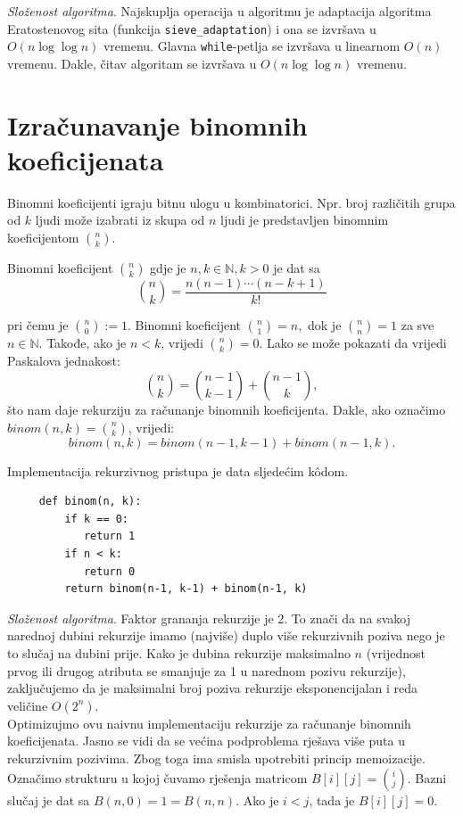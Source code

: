 \textit{Složenost algoritma}. Najskuplja operacija u algoritmu je ada\-ptacija algoritma Eratostenovog sita (funkcija \texttt{sieve\_adaptation}) i ona se izvršava u $O(n \log \log n)$ vremenu. Glavna \texttt{while}-petlja se izvršava u linearnom $O(n)$ vremenu. Dakle, čitav algoritam se izvršava u 
 $O(n \log \log n)$ vremenu.
 
  \section{Izračunavanje binomnih koeficijenata} 
  
  Binomni koeficijenti igraju bitnu ulogu u kombinatorici. Npr. broj različitih grupa od $k$ ljudi može izabrati iz skupa od $n$ ljudi je predstavljen binomnim koeficijentom $\binom{n}{k}$. 
  
  \begin{definition}
  	 Binomni koeficijent $\binom{n}{k}$ gdje je $n, k \in \mathbb{N}, k > 0$  je dat sa 
  	 $$\binom{n}{k} = \frac{n(n-1) \cdots (n-k+1)}{k!}$$
  \end{definition}
  
pri čemu je $\binom{n}{0} := 1$. Binomni koeficijent $\binom{n}{1} = n,$ dok je $\binom{n}{n} = 1$ za sve $n \in \mathbb{N}.$ Takođe, ako je $n <k$, vrijedi $\binom{n}{k}=0$.   Lako se može pokazati da vrijedi Paskalova jednakost:
  $$ \binom{n}{k} = \binom{n-1}{k-1} + \binom{n-1}{k},$$
   što nam daje rekurziju za računanje binomnih koeficijenta. Dakle, ako označimo $binom(n, k) = \binom{n}{k}$, vrijedi:
   $$ binom(n, k)= binom(n-1, k-1) + binom(n-1, k).$$
   
   Implementacija rekurzivnog pristupa je data sljedećim k\^odom.
   
   \begin{verbatim}
     def binom(n, k): 
         if k == 0:
            return 1
         if n < k:
            return 0
         return binom(n-1, k-1) + binom(n-1, k)
   \end{verbatim}
  \textit{Složenost algoritma}. Faktor grananja rekurzije je 2. To znači da na svakoj narednoj dubini rekurzije imamo (najviše) duplo više rekurzivnih poziva nego je to slučaj na dubini prije.  Kako je dubina rekurzije maksimalno $n$ (vrijednost prvog ili drugog atributa se smanjuje za 1 u narednom pozivu rekurzije), zaključujemo da je maksimalni broj poziva rekurzije eksponenci\-jalan i reda veličine $O(2^n)$. \\
  
  Optimizujmo ovu naivnu implementaciju rekurzije za računanje binomnih koeficijenata.  Jasno se vidi da se većina podproblema rješava više puta u rekurzivnim pozivima. Zbog toga ima smisla upotrebiti princip memoizacije. Označimo strukturu u kojoj čuvamo rješenja matricom $B[i][j]= \binom{i}{j}$. Bazni slučaj je  dat sa $B(n, 0) = 1 = B(n,n)$. Ako je $i < j$, tada je $B[i][j] = 0$. 
  
